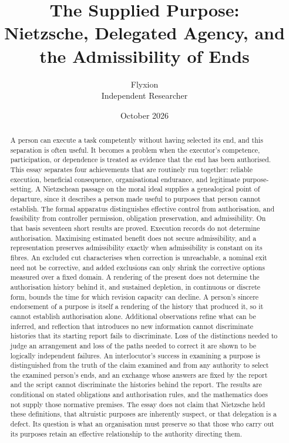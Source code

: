 \documentclass[11pt]{article}
\title{The Supplied Purpose:\\
Nietzsche, Delegated Agency, and the Admissibility of Ends}
\author{Flyxion\\ \small Independent Researcher}
\date{October 2026}
\theoremstyle{definition}
\theoremstyle{remark}
\begin{document}
\maketitle

\begin{abstract}
\noindent
A person can execute a task competently without having selected its end, and this separation is often useful. It becomes a problem when the executor's competence, participation, or dependence is treated as evidence that the end has been authorised. This essay separates four achievements that are routinely run together: reliable execution, beneficial consequence, organisational endurance, and legitimate purpose-setting. A Nietzschean passage on the moral ideal supplies a genealogical point of departure, since it describes a person made useful to purposes that person cannot establish. The formal apparatus distinguishes effective control from authorisation, and feasibility from controller permission, obligation preservation, and admissibility. On that basis seventeen short results are proved. Execution records do not determine authorisation. Maximising estimated benefit does not secure admissibility, and a representation preserves admissibility exactly when admissibility is constant on its fibres. An excluded cut characterises when correction is unreachable, a nominal exit need not be corrective, and added exclusions can only shrink the corrective options measured over a fixed domain. A rendering of the present does not determine the authorisation history behind it, and sustained depletion, in continuous or discrete form, bounds the time for which revision capacity can decline. A person's sincere endorsement of a purpose is itself a rendering of the history that produced it, so it cannot establish authorisation alone. Additional observations refine what can be inferred, and reflection that introduces no new information cannot discriminate histories that its starting report fails to discriminate. Loss of the distinctions needed to judge an arrangement and loss of the paths needed to correct it are shown to be logically independent failures. An interlocutor's success in examining a purpose is distinguished from the truth of the claim examined and from any authority to select the examined person's ends, and an exchange whose answers are fixed by the report and the script cannot discriminate the histories behind the report. The results are conditional on stated obligations and authorisation rules, and the mathematics does not supply those normative premises. The essay does not claim that Nietzsche held these definitions, that altruistic purposes are inherently suspect, or that delegation is a defect. Its question is what an organisation must preserve so that those who carry out its purposes retain an effective relationship to the authority directing them.
\end{abstract}
\end{document}
